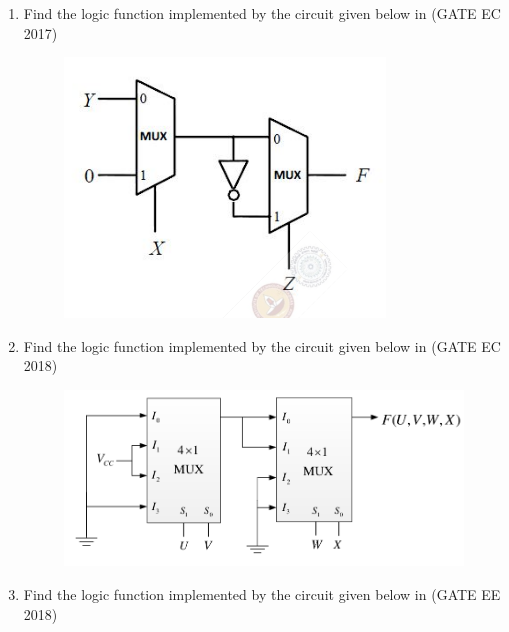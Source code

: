 \begin{enumerate}[label=\arabic*.,ref=\theenumi]
\item 
\label{prob:2017-gate-ec-16}
Find the logic function implemented by the circuit given below 
in 
\hfill (GATE EC 2017)
\begin{figure}[!ht]
\centering
	\includegraphics[width=\columnwidth]{figs/2017-gate-ec-16.png}
\caption{}
\label{fig:2017-gate-ec-16}
\end{figure}
\item 
\label{prob:2018-gate-ec-31}
Find the logic function implemented by the circuit given below 
in 
\hfill (GATE EC 2018)
\begin{figure}[!ht]
\centering
	\includegraphics[width=\columnwidth]{figs/2018-gate-ec-31.png}
\caption{}
\label{fig:2018-gate-ec-31}
\end{figure}
\item 
\label{prob:2018-gate-ee-14}
Find the logic function implemented by the circuit given below 
in 
\hfill (GATE EE 2018)

\end{enumerate}
